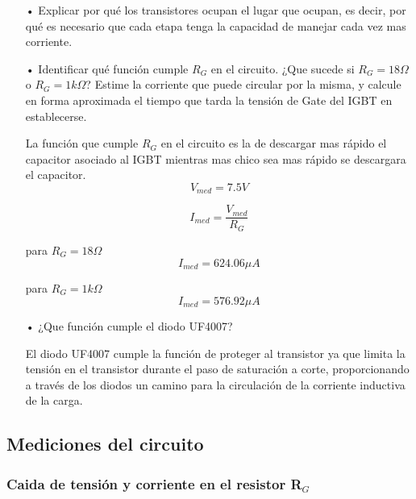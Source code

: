 \documentclass[a4paper,10pt]{article}
\begin{document}
\begin{enumerate}
	\item[•] Explicar por qué los transistores ocupan el lugar que ocupan, es decir, por qué es necesario que cada etapa tenga la capacidad de manejar cada vez mas corriente.
	\item[•]	 Identificar qué función cumple $R_ {G}$ en el circuito. ¿Que sucede si $R_ {G} = 18\unit{\Omega}$ o $R_ {G} = 1k\unit{\Omega}$? Estime la corriente que puede circular por la misma, y calcule en forma aproximada el tiempo que tarda la tensión de Gate del IGBT en establecerse.
	
	La función que cumple $R_ {G}$ en el circuito es la de descargar mas rápido el capacitor asociado al IGBT mientras mas chico sea mas rápido se descargara el capacitor.
	\begin{equation}
	V_{med} = 7.5 \unit{V}	
	\end{equation}
	
	\begin{equation}
	I_{med} = \frac{V_{med}}{R_G}
	\end{equation}
	
	para $R_{G}=18 \unit{\Omega}$
	\begin{equation}
	I_{med}= 624.06 \unit{\mu A} 
	\end{equation}
	
	para $R_{G}=1 \unit{k \Omega}$	
	\begin{equation}
	I_{med}= 576.92 \unit{\mu A} 
	\end{equation}	
	
	
	\item[•] ¿Que función cumple el diodo UF4007?
	
	El diodo UF4007 cumple la función de proteger al transistor ya que limita la tensión en el transistor durante el paso de saturación a corte, proporcionando a través de los diodos un camino para la circulación de la corriente inductiva de la carga.
	
\end{enumerate}

\subsection{Mediciones del circuito}

\subsubsection{Caida de tensión y corriente en el resistor R$_ {G}$}
\end{document}
